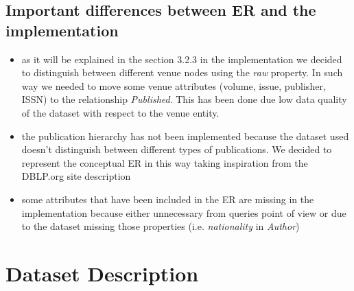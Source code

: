 \documentclass{Configuration_Files/PoliMi3i_thesis}
\begin{document}
\section{Important differences between ER and the implementation}
\begin{itemize}
    \item as it will be explained in the section 3.2.3 in the implementation we decided to distinguish between different venue
            nodes using the \emph{raw} property. In such way we needed to move some venue attributes (volume, issue, publisher, ISSN)
            to the relationship \emph{Published}. This has been done due low data quality of the dataset with respect to the venue entity.
    \item the publication hierarchy has not been implemented because the dataset used doesn't distinguish between different types of
            publications. We decided to represent the conceptual ER in this way taking inspiration from the DBLP.org site description
    \item some attributes that have been included in the ER are missing in the implementation because either unnecessary from queries
            point of view or due to the dataset missing those properties (i.e. \emph{nationality} in \emph{Author})
\end{itemize}

\chapter{Dataset Description}
\end{document}
